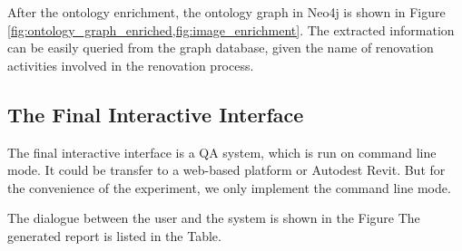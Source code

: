 After the ontology enrichment, the ontology graph in Neo4j is shown in Figure \ref{fig:ontology_graph_enriched,fig:image_enrichment}.
The extracted information can be easily queried from the graph database, given the name of renovation activities involved in the renovation process.

\subsection{The Final Interactive Interface}
The final interactive interface is a QA system, which is run on command line mode. It could be transfer to a web-based platform
or Autodest Revit. But for the convenience of the experiment, we only implement the command line mode.

The dialogue between the user and the system is shown in the Figure %
The generated report is listed in the Table.
        





